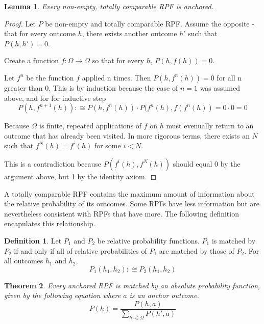 \documentclass[twoside]{article}
\theoremstyle{plain}%
\newtheorem{theorem}{Theorem}[section]
\newtheorem{lemma}[theorem]{Lemma}
\theoremstyle{definition}
\newtheorem{definition}{Definition}[section]
\theoremstyle{remark}
\begin{document}
\begin{lemma}
\label{lemma:totally_comp_anchored}
Every non-empty, totally comparable RPF is anchored.
\end{lemma}

\begin{proof}
Let \(P\) be non-empty and totally comparable RPF. Assume the opposite - that for every outcome \(h\), there exists another outcome \(h'\) such that \(P(h, h') = 0\).

Create a function \(f: \Omega \rightarrow \Omega\) so that for every \(h\), \(P(h, f(h)) = 0\).

Let \(f^n\) be the function \(f\) applied n times. Then \(P(h, f^n(h)) = 0\) for all n greater than 0. This is by induction because the case of \(n = 1\) was assumed above, and for for inductive step
\[P(h, f^{n+1}(h)) :\cong P(h, f^n(h)) \cdot P(f^n(h), f(f^n(h)) = 0 \cdot 0 = 0\]

Because \(\Omega\) is finite, repeated applications of \(f\) on \(h\) must evenually return to an outcome that has already been visited. In more rigorous terms, there exists an \(N\) such that \(f^N(h) = f^i(h)\) for some \(i < N\).

This is a contradiction because \(P(f^i(h), f^N(h))\) should equal 0 by the argument above, but 1 by the identity axiom.
\end{proof}

A totally comparable RPF contains the maximum amount of information about the relative probability of its outcomes. Some RPFs have less information but are nevertheless consistent with RPFs that have more. The following definition encapulates this relationship.

\begin{definition}
Let \(P_1\) and \(P_2\) be relative probability functions. \(P_1\) is matched by \(P_2\) if and only if all of relative probabilities of \(P_1\) are matched by those of \(P_2\). For all outcomes \(h_1\) and \(h_2\),
\[P_1(h_1, h_2) :\cong P_2(h_1, h_2)\]
\end{definition}

\begin{theorem}
\label{thm:absolute_prob_formula}
Every anchored RPF is matched by an absolute probability function, given by the following equation where \(a\) is an anchor outcome.
\[P(h) = \frac{P(h, a)}{\sum_{h' \in \Omega}P(h', a)}\]
\end{theorem}
\end{document}
